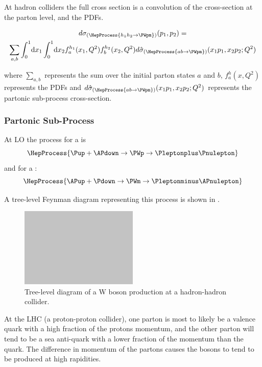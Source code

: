 At hadron colliders the full cross section is a convolution of the cross-section
at the parton level, and the \acp{PDF}.

\begin{multline}
  d\sigma_{(\HepProcess{h_1 h_2 \to \PWpm})}(p_1,p_2) = \\
  \sum\limits_{a,b}
  \int_0^1 \! \mathrm{d} x_1 
  \int_0^1 \! \mathrm{d} x_2 
  f_a^{h_1}(x_1,Q^2)
  f_b^{h_2}(x_2,Q^2) 
  d\hat{\sigma}_{(\HepProcess{a b \to \PWpm})}(x_1 p_1, x_2 p_2; Q^2)
  \label{wbos:xsec}
\end{multline}

where $\sum\limits_{a,b}$ represents the sum over the initial parton states $a$
and $b$, $f_a^{h}(x,Q^2)$ represents the \acp{PDF} and
$d\hat{\sigma}_{(\HepProcess{a b \to \PWpm})}(x_1 p_1, x_2 p_2; Q^2)$
represents the partonic sub-process cross-section.

\subsubsection*{Partonic Sub-Process}

At \ac{LO} the process for a \PWp is
\begin{equation}
  \HepProcess{\Pup + \APdown \to \PWp \to \Pleptonplus \Pnulepton} 
  \label{wbos:wpprod} 
\end{equation}
and for a \PWm:
\begin{equation}
  \HepProcess{\APup + \Pdown \to \PWm \to \Pleptonminus \APnulepton}
  \label{wbos:wmprod} 
\end{equation}

A tree-level Feynman diagram representing this process is shown in
.

\begin{figure}[htb]
  \centering
  \includegraphics[width=0.5\textwidth]{placeholder}
  \caption{Tree-level diagram of a W boson production at a hadron-hadron collider.}
  \label{wbos:feynman}
\end{figure}

At the \ac{LHC} (a proton-proton collider), one parton is most to likely be a
valence quark with a high fraction of the protons momentum, and the other
parton will tend to be a sea anti-quark with a lower fraction of the momentum
than the quark. The difference in momentum of the partons causes the \PW bosons 
to tend to be produced at high rapidities. 

